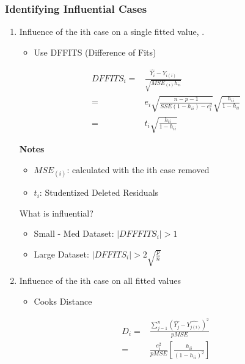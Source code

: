 \documentclass[11pt]{article}
\begin{document}
\subsubsection{Identifying Influential Cases}
\label{sec:org20fddd5}
\begin{enumerate}
\item Influence of the ith case on a single fitted value, .
\label{sec:org1d79650}
\begin{itemize}
\item Use DFFITS (Difference of Fits)
\end{itemize}

\begin{equation}
\begin{split}
DFFITS_i = & \frac{\hat{Y_i} - Y_{i(i)}}{\sqrt{MSE_{(i)} h_{ii}}}\\
= & e_i \sqrt{\frac{n - p - 1}{SSE(1 - h_{ii}) - e_i^2}} \sqrt{\frac{h_{ii}}{1 - h_{ii}}}\\
= & t_i \sqrt{\frac{h_{ii}}{1 - h_{ii}}}
\end{split}
\end{equation}

\textbf{Notes}
\begin{itemize}
\item \(MSE_{(i)}\): calculated with the ith case removed
\item \(t_i\): Studentized Deleted Residuals
\end{itemize}

What is influential?
\begin{itemize}
\item Small - Med Dataset: \(|DFFFITS_i| > 1\)
\item Large Dataset: \(|DFFITS_i| > 2 \sqrt{\frac{p}{n}}\)
\end{itemize}
\item Influence of the ith case on all fitted values
\label{sec:org0330043}
\begin{itemize}
\item Cooks Distance
\end{itemize}

\begin{equation}
\begin{split}
D_i = & \frac{\sum_{j = 1}^{n} (\hat{Y_j} - \hat{Y_{j(i)}})^2}{p MSE}\\
= & \frac{e_i^2}{p MSE} [\frac{h_{ii}}{(1 - h_{ii})^2}]
\end{split}
\end{equation}


\end{enumerate}
\end{document}
